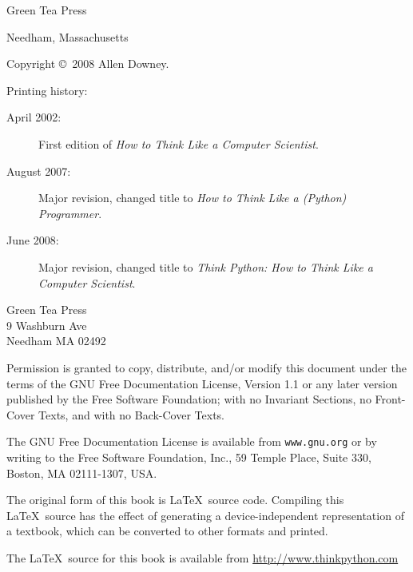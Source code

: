 \documentclass[10pt]{book}
\begin{document}
\begin{latexonly}
\begin{flushright}
\vspace{0.5in}

{\Large Green Tea Press}

{\small Needham, Massachusetts}

\vfill

\end{flushright}


\pagebreak
\thispagestyle{empty}

{\small
Copyright \copyright ~2008 Allen Downey.


Printing history:

\begin{description}

\item[April 2002:] First edition of {\em How to Think Like
a Computer Scientist}.

\item[August 2007:] Major revision, changed title to
{\em How to Think Like a (Python) Programmer}.

\item[June 2008:] Major revision, changed title to
{\em Think Python: How to Think Like
a Computer Scientist}.

\end{description}

\vspace{0.2in}

\begin{flushleft}
Green Tea Press       \\
9 Washburn Ave \\
Needham MA 02492
\end{flushleft}

Permission is granted to copy, distribute, and/or modify this document
under the terms of the GNU Free Documentation License, Version 1.1 or
any later version published by the Free Software Foundation; with no
Invariant Sections, no Front-Cover Texts, and with no Back-Cover Texts.

The GNU Free Documentation License is available from {\tt www.gnu.org}
or by writing to the Free Software Foundation, Inc., 59 Temple Place,
Suite 330, Boston, MA 02111-1307, USA.

The original form of this book is \LaTeX\ source code.  Compiling this
\LaTeX\ source has the effect of generating a device-independent
representation of a textbook, which can be converted to other formats
and printed.

The \LaTeX\ source for this book is available from
\url{http://www.thinkpython.com}

\vspace{0.2in}

} %

\end{latexonly}
\end{document}
